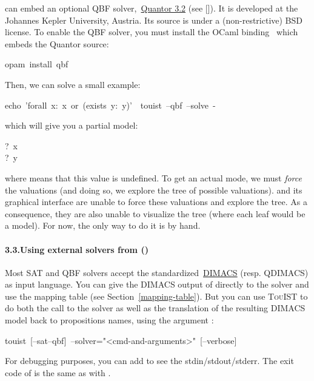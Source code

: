 \noindent{} can embed an optional QBF solver,~\href{http://fmv.jku.at/quantor/}{Quantor 3.2} (see
[]). It is developed at the Johannes Kepler University, Austria.
Its source is under a (non-restrictive) BSD license. To enable the QBF
solver, you must install the OCaml binding~\href{https://github.com/c-cube/ocaml-qbf}{} which embeds
the Quantor source:%
\begin{mdpre}%
\noindent{}opam~install~qbf%
\end{mdpre}\noindent Then, we can solve a small example:
\begin{mdpre}%
\noindent{}echo~'forall~x:~x~or~(exists~y:~y)'~\textbar{}~touist~--qbf~--solve~-%
\end{mdpre}\noindent which will give you a partial model:
\begin{mdpre}%
\noindent{}?~x\\
?~y%
\end{mdpre}\noindent where  means that this value is undefined. To get an actual mode, we
must \emph{force} the valuations (and doing so, we explore the tree of possible
valuations).  and its graphical interface are unable to force these
valuations and explore the tree. As a consequence, they are also unable
to visualize the tree (where each leaf would be a model). For now, the only
way to do it is by hand.

\paragraph*{3.3.\hspace*{0.5em}Using external solvers from  ()}\label{sec-using-external-solvers-from-touist---solver}%

\noindent Most SAT and QBF solvers accept the standardized~\href{http://www.satcompetition.org/2009/format-benchmarks2009.html}{DIMACS} (resp.
QDIMACS) as input language. You can give the DIMACS output of 
directly to the solver and use the mapping table (see Section~\ref{mapping-table}).
But you can use {\scshape TouIST} to do both the call to the solver as well as the
translation of the resulting DIMACS model back to propositions names, using
the argument :%
\begin{mdpre}%
\noindent{}touist~{}[--sat\textbar{}--qbf]~--solver="\textless{}cmd-and-arguments\textgreater{}"~{}[--verbose]%
\end{mdpre}\noindent For debugging purposes, you can add  to see the stdin/stdout/stderr.
The exit code of  is the same as with .


